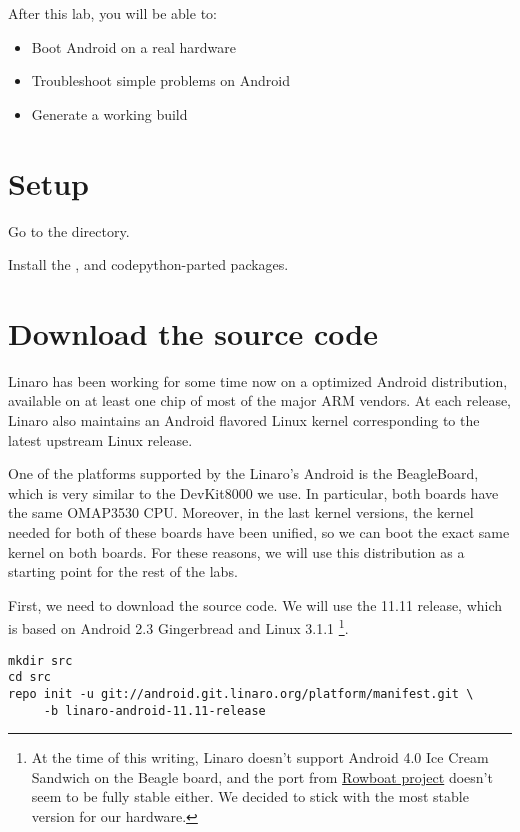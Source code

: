 
After this lab, you will be able to:
\begin{itemize}
  \item Boot Android on a real hardware
  \item Troubleshoot simple problems on Android
  \item Generate a working build
\end{itemize}

\section{Setup}

Go to the  directory.

Install the ,  and code{python-parted} packages.

\section{Download the source code}

Linaro has been working for some time now on a optimized Android distribution,
available on at least one chip of most of the major ARM vendors. At each release,
Linaro also maintains an Android flavored Linux kernel corresponding to the latest
upstream Linux release.

One of the platforms supported by the Linaro's Android is the BeagleBoard, which
is very similar to the DevKit8000 we use. In particular, both boards have the
same OMAP3530 CPU. Moreover, in the last kernel versions,
the kernel needed for both of these boards have been unified, so we can boot the
exact same kernel on both boards. For these reasons, we will use this
distribution as a starting point for the rest of the labs.

First, we need to download the source code. We will use the 11.11 release, which
is based on Android 2.3 Gingerbread and Linux 3.1.1
\footnote{At the time of this writing, Linaro doesn't support Android 4.0 Ice Cream
Sandwich on the Beagle board, and the port from \href{http://code.google.com/p/rowboat}
{Rowboat project} doesn't seem to be fully stable either. We decided to stick
with the most stable version for our hardware.}.

\begin{verbatim}
mkdir src
cd src
repo init -u git://android.git.linaro.org/platform/manifest.git \
     -b linaro-android-11.11-release
\end{verbatim}

